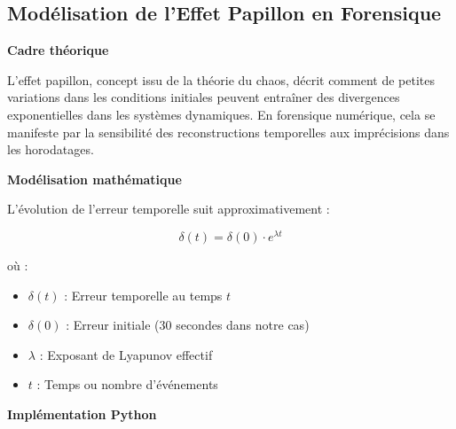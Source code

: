 \documentclass[12pt,a4paper]{article}
\begin{document}
\subsection{Modélisation de l'Effet Papillon en Forensique}

\textbf{Cadre théorique}

L'effet papillon, concept issu de la théorie du chaos, décrit comment de petites variations dans les conditions initiales peuvent entraîner des divergences exponentielles dans les systèmes dynamiques. En forensique numérique, cela se manifeste par la sensibilité des reconstructions temporelles aux imprécisions dans les horodatages.

\textbf{Modélisation mathématique}

L'évolution de l'erreur temporelle suit approximativement :

\[\delta(t) = \delta(0) \cdot e^{\lambda t}\]

où :
\begin{itemize}
\item $\delta(t)$ : Erreur temporelle au temps $t$
\item $\delta(0)$ : Erreur initiale (30 secondes dans notre cas)
\item $\lambda$ : Exposant de Lyapunov effectif
\item $t$ : Temps ou nombre d'événements
\end{itemize}

\textbf{Implémentation Python}
\end{document}
